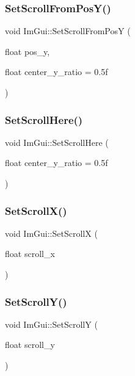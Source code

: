 \subsubsection{\texorpdfstring{Set\+Scroll\+From\+Pos\+Y()}{SetScrollFromPosY()}}
{\footnotesize\ttfamily void Im\+Gui\+::\+Set\+Scroll\+From\+PosY (\begin{DoxyParamCaption}\item[{float}]{pos\+\_\+y,  }\item[{float}]{center\+\_\+y\+\_\+ratio = {\ttfamily 0.5f} }\end{DoxyParamCaption})}

\mbox{\label{namespace_im_gui_aa60ea4a42b8d03d27431f8e79b9f0254}} 
\subsubsection{\texorpdfstring{Set\+Scroll\+Here()}{SetScrollHere()}}
{\footnotesize\ttfamily void Im\+Gui\+::\+Set\+Scroll\+Here (\begin{DoxyParamCaption}\item[{float}]{center\+\_\+y\+\_\+ratio = {\ttfamily 0.5f} }\end{DoxyParamCaption})}

\mbox{\label{namespace_im_gui_a0796750de8c50555d895f63e79ac87f0}} 
\subsubsection{\texorpdfstring{Set\+Scroll\+X()}{SetScrollX()}}
{\footnotesize\ttfamily void Im\+Gui\+::\+Set\+ScrollX (\begin{DoxyParamCaption}\item[{float}]{scroll\+\_\+x }\end{DoxyParamCaption})}

\mbox{\label{namespace_im_gui_a41833555962807384432e6fc94d46ec9}} 
\subsubsection{\texorpdfstring{Set\+Scroll\+Y()}{SetScrollY()}}
{\footnotesize\ttfamily void Im\+Gui\+::\+Set\+ScrollY (\begin{DoxyParamCaption}\item[{float}]{scroll\+\_\+y }\end{DoxyParamCaption})}

